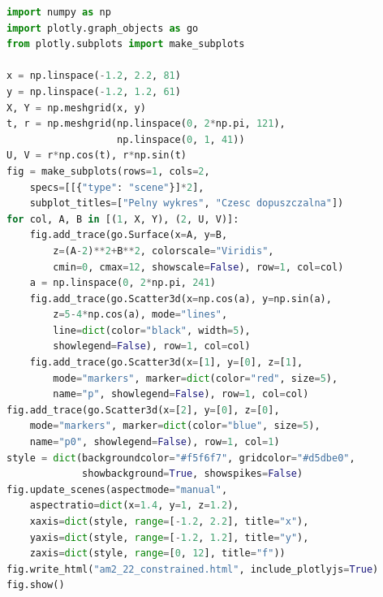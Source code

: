 \begin{lstlisting}[language=Python]
import numpy as np
import plotly.graph_objects as go
from plotly.subplots import make_subplots

x = np.linspace(-1.2, 2.2, 81)
y = np.linspace(-1.2, 1.2, 61)
X, Y = np.meshgrid(x, y)
t, r = np.meshgrid(np.linspace(0, 2*np.pi, 121),
                   np.linspace(0, 1, 41))
U, V = r*np.cos(t), r*np.sin(t)
fig = make_subplots(rows=1, cols=2,
    specs=[[{"type": "scene"}]*2],
    subplot_titles=["Pelny wykres", "Czesc dopuszczalna"])
for col, A, B in [(1, X, Y), (2, U, V)]:
    fig.add_trace(go.Surface(x=A, y=B,
        z=(A-2)**2+B**2, colorscale="Viridis",
        cmin=0, cmax=12, showscale=False), row=1, col=col)
    a = np.linspace(0, 2*np.pi, 241)
    fig.add_trace(go.Scatter3d(x=np.cos(a), y=np.sin(a),
        z=5-4*np.cos(a), mode="lines",
        line=dict(color="black", width=5),
        showlegend=False), row=1, col=col)
    fig.add_trace(go.Scatter3d(x=[1], y=[0], z=[1],
        mode="markers", marker=dict(color="red", size=5),
        name="p", showlegend=False), row=1, col=col)
fig.add_trace(go.Scatter3d(x=[2], y=[0], z=[0],
    mode="markers", marker=dict(color="blue", size=5),
    name="p0", showlegend=False), row=1, col=1)
style = dict(backgroundcolor="#f5f6f7", gridcolor="#d5dbe0",
             showbackground=True, showspikes=False)
fig.update_scenes(aspectmode="manual",
    aspectratio=dict(x=1.4, y=1, z=1.2),
    xaxis=dict(style, range=[-1.2, 2.2], title="x"),
    yaxis=dict(style, range=[-1.2, 1.2], title="y"),
    zaxis=dict(style, range=[0, 12], title="f"))
fig.write_html("am2_22_constrained.html", include_plotlyjs=True)
fig.show()
\end{lstlisting}
